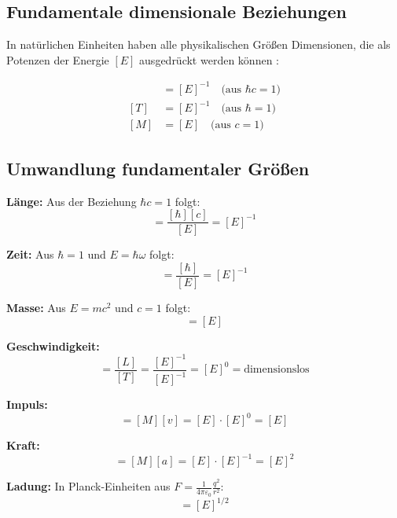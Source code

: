 	\subsection{Fundamentale dimensionale Beziehungen}
	
	In natürlichen Einheiten haben alle physikalischen Größen Dimensionen, die als Potenzen der Energie $[E]$ ausgedrückt werden können \cite{weinberg1995,peskin1995}:
	
	\begin{align}
		[L] &= [E]^{-1} \quad \text{(aus } \hbar c = 1\text{)} \\
		[T] &= [E]^{-1} \quad \text{(aus } \hbar = 1\text{)} \\
		[M] &= [E] \quad \text{(aus } c = 1\text{)}
	\end{align}
	
	\subsection{Umwandlung fundamentaler Größen}
	
	\textbf{Länge:} Aus der Beziehung $\hbar c = 1$ folgt:
	\begin{equation}
		[L] = \frac{[\hbar][c]}{[E]} = [E]^{-1}
	\end{equation}
	
	\textbf{Zeit:} Aus $\hbar = 1$ und $E = \hbar \omega$ folgt:
	\begin{equation}
		[T] = \frac{[\hbar]}{[E]} = [E]^{-1}
	\end{equation}
	
	\textbf{Masse:} Aus $E = mc^2$ und $c = 1$ folgt:
	\begin{equation}
		[M] = [E]
	\end{equation}
	
	\textbf{Geschwindigkeit:} 
	\begin{equation}
		[v] = \frac{[L]}{[T]} = \frac{[E]^{-1}}{[E]^{-1}} = [E]^0 = \text{dimensionslos}
	\end{equation}
	
	\textbf{Impuls:}
	\begin{equation}
		[p] = [M][v] = [E] \cdot [E]^0 = [E]
	\end{equation}
	
	\textbf{Kraft:}
	\begin{equation}
		[F] = [M][a] = [E] \cdot [E]^{-1} = [E]^2
	\end{equation}
	
	\textbf{Ladung:} In Planck-Einheiten aus $F = \frac{1}{4\pi\varepsilon_0} \frac{q^2}{r^2}$:
	\begin{equation}
		[q] = [E]^{1/2}
	\end{equation}
	
